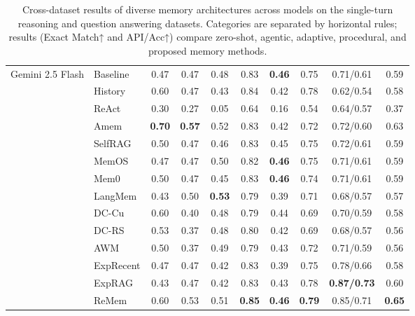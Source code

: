 \begin{table}[t!]
{\begin{tabular}{l l*{8}{c}}
\multirow{15}{*}{Gemini 2.5 Flash}
 & Baseline           & 0.47 & 0.47 & 0.48 & 0.83 & \textbf{0.46} & 0.75 & 0.71/0.61 & 0.59 \\
 & History       & 0.60 & 0.47 & 0.43 & 0.84 & 0.42 & 0.78 & 0.62/0.54 & 0.58 \\
\cmidrule(lr){2-10}
 & ReAct                    & 0.30 & 0.27 & 0.05 & 0.64 & 0.16 & 0.54 & 0.64/0.57 & 0.37 \\
 & Amem                     & \textbf{0.70} & \textbf{0.57} & 0.52 & 0.83 & 0.42 & 0.72 & 0.72/0.60 & 0.63 \\
\cmidrule(lr){2-10}
 & SelfRAG                  & 0.50 & 0.47 & 0.46 & 0.83 & 0.45 & 0.75 & 0.72/0.61 & 0.59 \\
 & MemOS                    & 0.47 & 0.47 & 0.50 & 0.82 & \textbf{0.46} & 0.75 & 0.71/0.61 & 0.59 \\
 & Mem0                     & 0.50 & 0.47 & 0.45 & 0.83 & \textbf{0.46} & 0.74 & 0.71/0.61 & 0.59 \\
 & LangMem                  & 0.43 & 0.50 & \textbf{0.53} & 0.79 & 0.39 & 0.71 & 0.68/0.57 & 0.57 \\
\cmidrule(lr){2-10}
 & DC-Cu                    & 0.60 & 0.40 & 0.48 & 0.79 & 0.44 & 0.69 & 0.70/0.59 & 0.58 \\
 & DC-RS                    & 0.53 & 0.37 & 0.48 & 0.80 & 0.42 & 0.69 & 0.68/0.57 & 0.56 \\
 & AWM                      & 0.50 & 0.37 & 0.49 & 0.79 & 0.43 & 0.72 & 0.71/0.59 & 0.56 \\
\cmidrule(lr){2-10}
 & ExpRecent                & 0.47 & 0.47 & 0.42 & 0.83 & 0.39 & 0.75 & 0.78/0.66 & 0.58 \\
 & ExpRAG                   & 0.43 & 0.47 & 0.42 & 0.83 & 0.43 & 0.78 & \textbf{0.87/0.73} & 0.60 \\
 & ReMem                    & 0.60 & 0.53 & 0.51 & \textbf{0.85} & \textbf{0.46} & \textbf{0.79} & 0.85/0.71 & \textbf{0.65} \\
\bottomrule
\end{tabular}}
\caption{Cross-dataset results of diverse memory architectures across models on the single-turn reasoning and question answering datasets. 
Categories are separated by horizontal rules; results (Exact Match↑ and API/Acc↑) compare zero-shot, agentic, adaptive, procedural, and proposed memory methods. }
\label{tab:single_part}
\end{table}